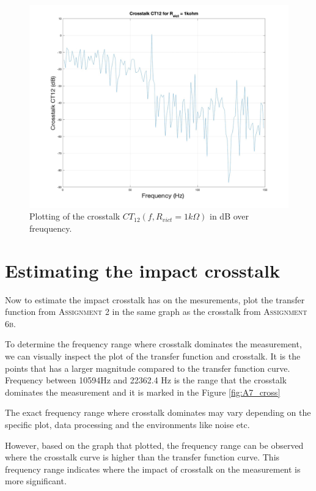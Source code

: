 \documentclass[
	a4paper,
	11pt,
]{article}
\begin{document}
\begin{figure}[htb!]
    \centerline{\includegraphics[width=12cm]{figure/A67/6b_CT12_plot.jpeg}}
    \caption{Plotting of the crosstalk \(CT_{12} (f, R_{vict}= 1k\Omega)\) in dB over freuquency. }
    \label{fig:A6_cross}
\end{figure}
\newpage

\section{Estimating the impact crosstalk}
Now to estimate the impact crosstalk has on the mesurements, plot the transfer function from \textsc{Assignment 2} in the same graph as the crosstalk from \textsc{Assignment 6b}.

To determine the frequency range where crosstalk dominates the measurement, we can visually inspect the plot of the transfer function and crosstalk. It is the points that has a larger magnitude compared to the transfer function curve. Frequency between 10594Hz and 22362.4 Hz is the range that the crosstalk dominates the measurement and it is marked in the Figure \ref{fig:A7_cross} 

The exact frequency range where crosstalk dominates may vary depending on the specific plot, data processing and the environments like noise etc. 

However, based on the graph that plotted, the frequency range can be observed where the crosstalk curve is higher than the transfer function curve.  This frequency range indicates where the impact of crosstalk on the measurement is more significant.
\end{document}
